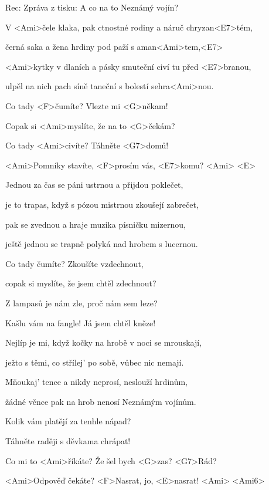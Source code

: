 

Rec: Zpráva z tisku:  A co na to Neznámý vojín?

\zs
V <Ami>čele klaka, pak ctnostné rodiny a náruč chryzan<E7>tém,

černá saka a žena hrdiny pod paží s aman<Ami>tem,<E7>

<Ami>kytky v dlaních a pásky smuteční civí tu před <E7>branou,

ulpěl na nich pach síně taneční s bolestí sehra<Ami>nou.
\ks

\zr
Co tady <F>čumíte? Vlezte mi <G>někam!

Copak si <Ami>myslíte, že na to <G>čekám?

Co tady <Ami>civíte? Táhněte <G7>domů!

<Ami>Pomníky stavíte, <F>prosím vás, <E7>komu? <Ami> <E>
\kr

\zs
Jednou za čas se páni ustrnou a přijdou poklečet,

je to trapas, když s pózou mistrnou zkoušejí zabrečet,

pak se zvednou a hraje muzika písničku mizernou,

ještě jednou se trapně polyká nad hrobem s lucernou.
\ks

\zr
Co tady čumíte? Zkoušíte vzdechnout,

copak si myslíte, že jsem chtěl zdechnout?

Z lampasů je nám zle, proč nám sem leze?

Kašlu vám na fangle! Já jsem chtěl kněze!
\kr

\zs
Nejlíp je mi, když kočky na hrobě v noci se mrouskají,

ježto s těmi, co střílej' po sobě, vůbec nic nemají.

Mňoukaj' tence a nikdy neprosí, neslouží hrdinům,

žádné věnce pak na hrob nenosí Neznámým vojínům.
\ks

\zr
Kolik vám platějí za tenhle nápad?

Táhněte raději s děvkama chrápat!

Co mi to <Ami>říkáte? Že šel bych <G>zas? <G7>Rád?

<Ami>Odpověď čekáte? <F>Nasrat, jo, <E>nasrat! <Ami> <Ami6>
\kr

\kp





